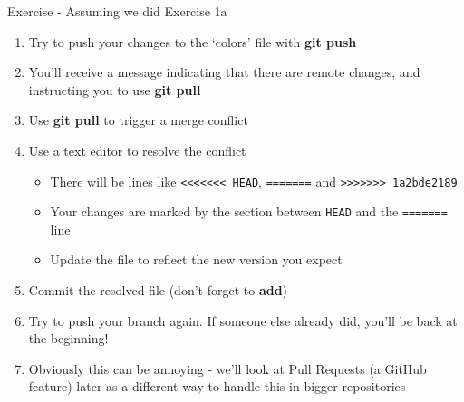 \documentclass{beamer}
\begin{document}
\begin{frame}
  \begin{block}{Exercise - Assuming we did Exercise 1a}
    \begin{enumerate}
      \item Try to push your changes to the \lq{}colors\rq{} file with \textbf{git push}
      \item You\rq{}ll receive a message indicating that there are remote changes, and instructing you to use \textbf{git pull}
      \item Use \textbf{git pull} to trigger a merge conflict
      \item Use a text editor to resolve the conflict
      \begin{itemize}
        \item There will be lines like \texttt{<<<<<<< HEAD}, \texttt{=======} and \texttt{>>>>>>> 1a2bde2189}
        \item Your changes are marked by the section between \texttt{HEAD} and the \texttt{=======} line
        \item Update the file to reflect the new version you expect
      \end{itemize}
      \item Commit the resolved file (don\rq{}t forget to \textbf{add})
      \item Try to push your branch again. If someone else already did, you\rq{}ll be back at the beginning!
      \item Obviously this can be annoying - we\rq{}ll look at Pull Requests (a GitHub feature) later as a different way to handle this in bigger repositories
    \end{enumerate}
  \end{block}
\end{frame}
\end{document}
